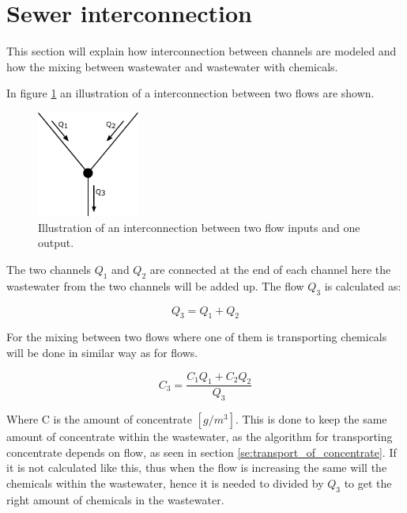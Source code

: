 \section{Sewer interconnection}\label{se:sewer_interconnection}
This section will explain how interconnection between channels are modeled and how the mixing between wastewater and wastewater with chemicals.

In figure \ref{fig:interconnections} an illustration of a interconnection between two flows are shown.

\begin{figure}[H]
\centering
\includegraphics[width=0.30\textwidth]{report/modeling/pictures/interconnections}
\caption{Illustration of an interconnection between two flow inputs and one output.}
\label{fig:interconnections}
\end{figure} 

The two channels $Q_1$ and $Q_2$ are connected at the end of each channel here the wastewater from the two channels will be added up. The flow $Q_3$ is calculated as:

\begin{equation}
	Q_3 = Q_1 + Q_2 	
\end{equation} 

For the mixing between two flows where one of them is transporting chemicals will be done in similar way as for flows. 

\begin{equation}\label{poop_addition_interconnection}
	C_3 = \frac{C_1 Q_1 + C_2 Q_2}{Q_3}
\end{equation}

Where C is the amount of concentrate $\left[g /m^3 \right]$. This is done to keep the same amount of concentrate within the wastewater, as the algorithm for transporting concentrate depends on flow, as seen in section \ref{se:transport_of_concentrate}. If it is not calculated like this, thus when the flow is increasing the same will the chemicals within the wastewater, hence it is needed to divided by $Q_3$ to get the right amount of chemicals in the wastewater.  
